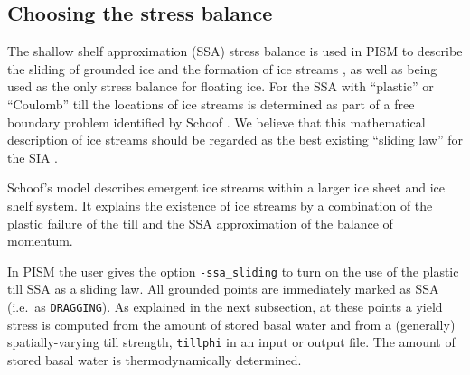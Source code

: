 \begin{comment}
\opt{shelfext\und} When computing ice shelf and stream velocity, PISM enforces boundary conditions using a fictitious extension of the ice shelf over the entire domain.  This extension provides strength only, it does not change the mass, driving force, or location of the calving front.  By default, it's strength will be computed using the current ice type at reference thickness, temperature, and strain rate, customizable using \texttt{-shelfext_H} (5 meters by default), \texttt{-shelfext_T} (263.15 K), \texttt{-shelfext_Du} (1 m/a per km).  The extension strength is used whenever ice thickness is less than the extension thickness to prevent the equations from becoming singular.  You can also specify the extension strength directly using \texttt{-shelfext_force_nuH} with units in Pa s.  Finally, you can compute strength using a \texttt{custom} ice type the ice used in the rest of PISM by giving \texttt{-shelfext_use_private_ice}.  This option will gives you a \texttt{custom} ice type which you can control via \texttt{-shelfext_ice_custom_} (see \texttt{-ice_type}).  All \texttt{-shelfext} options are displayed in \texttt{-help}.
\end{comment}


\subsection{Choosing the stress balance}  \label{subsect:ssacontrol}

The shallow shelf approximation (SSA) stress balance is used in PISM to describe the sliding of grounded ice and the formation of ice streams \cite{BBssasliding}, as well as being used as the only stress balance for floating ice.  For the SSA with ``plastic'' or ``Coulomb'' till the locations of ice streams is determined as part of a free boundary problem identified by Schoof \cite{SchoofStream}.  We believe that this mathematical description of ice streams should be regarded as the best existing ``sliding law'' for the SIA \cite{BBssasliding}.

Schoof's model \cite{SchoofStream} describes emergent ice streams within a larger ice sheet and ice shelf system.  It explains the existence of ice streams by a combination of the plastic failure of the till and the SSA approximation of the balance of momentum.  

In PISM the user gives the option \texttt{-ssa_sliding} to turn on the use of the plastic till SSA as a sliding law.  All grounded points are immediately marked as SSA (i.e.~as \texttt{DRAGGING}).  As explained in the next subsection, at these points a yield stress is computed from the amount of stored basal water and from a (generally) spatially-varying till strength, \texttt{tillphi} in an input or output file.  The amount of stored basal water is thermodynamically determined.

